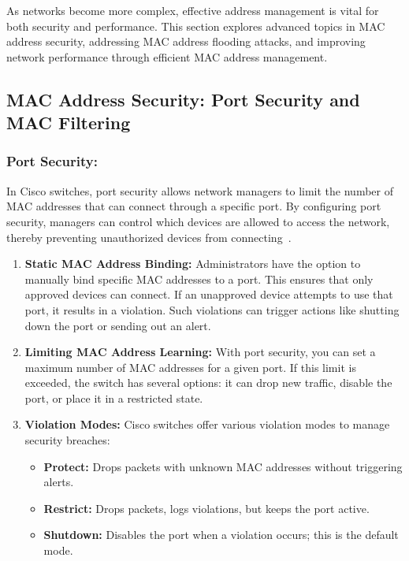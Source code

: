 \documentclass[11pt,a4paper]{article}
\begin{document}
As networks become more complex, effective address management is vital for both security and performance. This section explores advanced topics in MAC address security, addressing MAC address flooding attacks, and improving network performance through efficient MAC address management.

\subsection*{MAC Address Security: Port Security and MAC Filtering}
\subsubsection*{Port Security:}
In Cisco switches, port security allows network managers to limit the number of MAC addresses that can connect through a specific port. By configuring port security, managers can control which devices are allowed to access the network, thereby preventing unauthorized devices from connecting~\cite{Port-Security}.
\begin{enumerate}
    \item \textbf{Static MAC Address Binding:} Administrators have the option to manually bind specific MAC addresses to a port. This ensures that only approved devices can connect. If an unapproved device attempts to use that port, it results in a violation. Such violations can trigger actions like shutting down the port or sending out an alert.
    \item \textbf{Limiting MAC Address Learning:} With port security, you can set a maximum number of MAC addresses for a given port. If this limit is exceeded, the switch has several options: it can drop new traffic, disable the port, or place it in a restricted state.
    \item \textbf{Violation Modes:} Cisco switches offer various violation modes to manage security breaches:
        \begin{itemize}
            \item \textbf{Protect:} Drops packets with unknown MAC addresses without triggering alerts.
            \item \textbf{Restrict:} Drops packets, logs violations, but keeps the port active.
            \item \textbf{Shutdown:} Disables the port when a violation occurs; this is the default mode.
        \end{itemize}
\end{enumerate}
\end{document}
